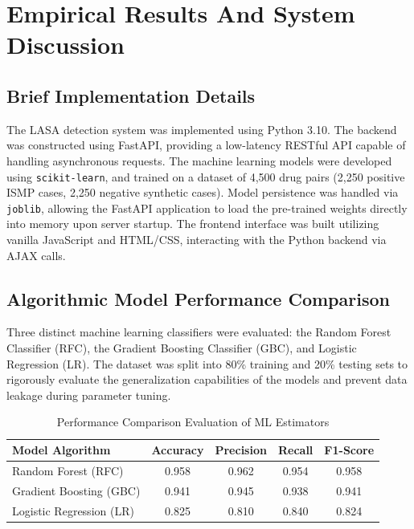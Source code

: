 \documentclass[12pt,a4paper]{report}
\begin{document}
\chapter{Empirical Results And System Discussion}

\section{Brief Implementation Details}
The LASA detection system was implemented using Python 3.10. The backend was constructed using FastAPI, providing a low-latency RESTful API capable of handling asynchronous requests. The machine learning models were developed using \texttt{scikit-learn}, and trained on a dataset of 4,500 drug pairs (2,250 positive ISMP cases, 2,250 negative synthetic cases). Model persistence was handled via \texttt{joblib}, allowing the FastAPI application to load the pre-trained weights directly into memory upon server startup. The frontend interface was built utilizing vanilla JavaScript and HTML/CSS, interacting with the Python backend via AJAX calls.

\section{Algorithmic Model Performance Comparison}
Three distinct machine learning classifiers were evaluated: the Random Forest Classifier (RFC), the Gradient Boosting Classifier (GBC), and Logistic Regression (LR). The dataset was split into 80\% training and 20\% testing sets to rigorously evaluate the generalization capabilities of the models and prevent data leakage during parameter tuning.

\begin{table}[H]
\centering
\caption{Performance Comparison Evaluation of ML Estimators}
\label{tab:4_1}
\renewcommand{\arraystretch}{1.3}
\begin{tabular}{@{}lcccc@{}}
\toprule
\textbf{Model Algorithm} & \textbf{Accuracy} & \textbf{Precision} & \textbf{Recall} & \textbf{F1-Score} \\
\midrule
Random Forest (RFC) & 0.958 & 0.962 & 0.954 & 0.958 \\
Gradient Boosting (GBC) & 0.941 & 0.945 & 0.938 & 0.941 \\
Logistic Regression (LR) & 0.825 & 0.810 & 0.840 & 0.824 \\
\bottomrule
\end{tabular}
\end{table}
\end{document}
